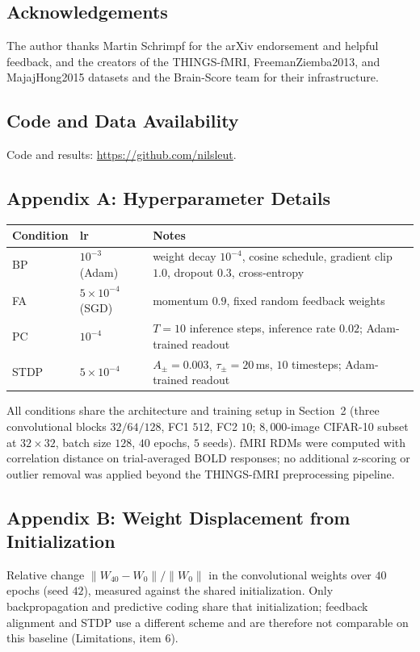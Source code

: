 \documentclass[10pt,twocolumn]{article}
\begin{document}
\subsection*{Acknowledgements}
The author thanks Martin Schrimpf for the arXiv endorsement and helpful feedback, and the creators of the THINGS-fMRI, FreemanZiemba2013, and MajajHong2015 datasets and the Brain-Score team for their infrastructure.

\subsection*{Code and Data Availability}
Code and results: \url{https://github.com/nilsleut}.

\subsection*{Appendix A: Hyperparameter Details}
\begingroup
\footnotesize
\begin{tabular}{@{}llp{3.3cm}@{}}
\toprule
Condition & lr & Notes \\
\midrule
BP & $10^{-3}$ (Adam) & weight decay $10^{-4}$, cosine schedule, gradient clip $1.0$, dropout $0.3$, cross-entropy \\
FA & $5\times10^{-4}$ (SGD) & momentum $0.9$, fixed random feedback weights \\
PC & $10^{-4}$ & $T=10$ inference steps, inference rate $0.02$; Adam-trained readout \\
STDP & $5\times10^{-4}$ & $A_\pm=0.003$, $\tau_\pm=20$\,ms, $10$ timesteps; Adam-trained readout \\
\bottomrule
\end{tabular}
\endgroup

\noindent All conditions share the architecture and training setup in Section~2 (three convolutional blocks $32/64/128$, FC1 $512$, FC2 $10$; $8{,}000$-image CIFAR-10 subset at $32\times32$, batch size $128$, $40$ epochs, $5$ seeds). fMRI RDMs were computed with correlation distance on trial-averaged BOLD responses; no additional z-scoring or outlier removal was applied beyond the THINGS-fMRI preprocessing pipeline.

\subsection*{Appendix B: Weight Displacement from Initialization}

\noindent Relative change $\lVert W_{40} - W_{0}\rVert / \lVert W_{0}\rVert$ in the convolutional weights over $40$ epochs (seed $42$), measured against the shared initialization. Only backpropagation and predictive coding share that initialization; feedback alignment and STDP use a different scheme and are therefore not comparable on this baseline (Limitations, item 6).
\end{document}
